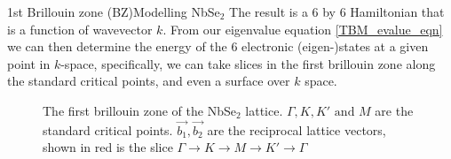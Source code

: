 \documentclass[9pt]{beamer}
\begin{document}
\begin{frame}{1st Brillouin zone (BZ)}{Modelling NbSe$_2$}
  The result is a 6 by 6 Hamiltonian that is a function of wavevector $k$. From our eigenvalue equation \eqref{TBM_evalue_eqn} we can then determine the energy of the 6 electronic (eigen-)states at a given point in $k$-space, specifically, we can take slices in the first brillouin zone along the standard critical points, and even a surface over $k$ space.

  \begin{figure}
    \centering
    \caption{The first brillouin zone of the NbSe$_2$ lattice. $\Gamma, K, K' \text{ and } M$ are the standard critical points. $\vec{b_1}, \vec{b_2}$ are the reciprocal lattice vectors, shown in red is the slice $\Gamma \rightarrow K \rightarrow M \rightarrow K' \rightarrow \Gamma$}
  \end{figure}

\end{frame}
\end{document}
